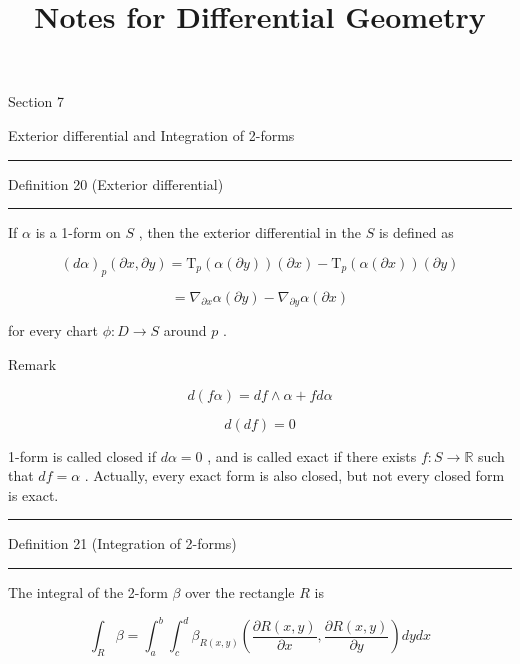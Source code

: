 \documentclass[lang=cn,a4paper,11pt,openany,twoside]{elegantbook}
\newcommand{\HRule}{\begin{center}\rule{0.9\linewidth}{0.2mm}\end{center}}
\newcommand{\ForceRightPage}{%
  \clearpage
  \ifodd\value{page}\relax
  \else
    \hbox{}\thispagestyle{empty}\newpage
  \fi
}
\begin{document}
\title{Notes for Differential Geometry}
\date{}
\maketitle
\setcounter{page}{1}

\frontmatter
{}     %
\clearpage
\tableofcontents
\clearpage

\ForceRightPage
\mainmatter



Section 7

Exterior differential and Integration of 2-forms

\HRule

Definition 20 (Exterior differential)

\HRule

If \(\alpha\) is a 1-form on \(S\) , then the exterior differential in the \(S\) is defined as

\[
{\left( d\alpha \right) }_{p}\left( {\partial x,\partial y}\right)  = {\mathrm{T}}_{p}\left( {\alpha \left( {\partial y}\right) }\right) \left( {\partial x}\right)  - {\mathrm{T}}_{p}\left( {\alpha \left( {\partial x}\right) }\right) \left( {\partial y}\right)
\]

\[
= {\nabla }_{\partial x}\alpha \left( {\partial y}\right)  - {\nabla }_{\partial y}\alpha \left( {\partial x}\right)
\]

for every chart \(\phi  : D \rightarrow  S\) around \(p\) .

Remark

\[
d\left( {f\alpha }\right)  = {df} \land  \alpha  + {fd\alpha }
\]

\[
d\left( {df}\right)  = 0
\]

1-form is called closed if \({d\alpha } = 0\) , and is called exact if there exists \(f : S \rightarrow  \mathbb{R}\) such that \({df} = \alpha\) . Actually, every exact form is also closed, but not every closed form is exact.

\HRule

Definition 21 (Integration of 2-forms)

\HRule

The integral of the 2-form \(\beta\) over the rectangle \(R\) is

\[
{\int }_{R}\beta  = {\int }_{a}^{b}{\int }_{c}^{d}{\beta }_{R\left( {x,y}\right) }\left( {\frac{\partial R\left( {x,y}\right) }{\partial x},\frac{\partial R\left( {x,y}\right) }{\partial y}}\right) {dydx}
\]
\end{document}
